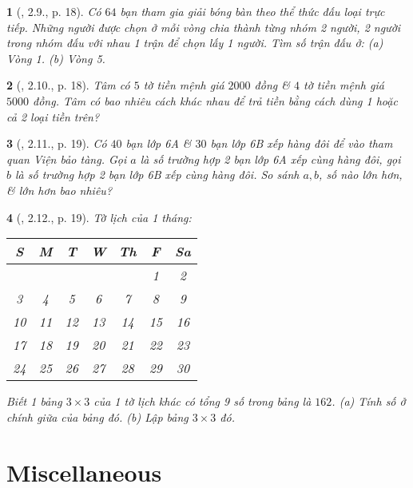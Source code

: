 \documentclass{article}
\newtheorem{baitoan}{}
\begin{document}
\begin{baitoan}[\cite{TLCT_THCS_Toan_6_so_hoc}, 2.9., p. 18]
	Có $64$ bạn tham gia giải bóng bàn theo thể thức đấu loại trực tiếp. Những người được chọn ở mỗi vòng chia thành từng nhóm 2 người, 2 người trong nhóm đấu với nhau 1 trận để chọn lấy 1 người. Tìm số trận đấu ở: (a) Vòng 1. (b) Vòng 5.
\end{baitoan}

\begin{baitoan}[\cite{TLCT_THCS_Toan_6_so_hoc}, 2.10., p. 18]
	Tâm có $5$ tờ tiền mệnh giá $2000$ đồng \& $4$ tờ tiền mệnh giá $5000$ đồng. Tâm có bao nhiêu cách khác nhau để trả tiền bằng cách dùng 1 hoặc cả 2 loại tiền trên?
\end{baitoan}

\begin{baitoan}[\cite{TLCT_THCS_Toan_6_so_hoc}, 2.11., p. 19]
	Có $40$ bạn lớp 6A \& $30$ bạn lớp 6B xếp hàng đôi để vào tham quan Viện bảo tàng. Gọi $a$ là số trường hợp 2 bạn lớp 6A xếp cùng hàng đôi, gọi $b$ là số trường hợp 2 bạn lớp 6B xếp cùng hàng đôi. So sánh $a,b$, số nào lớn hơn, \& lớn hơn bao nhiêu?
\end{baitoan}

\begin{baitoan}[\cite{TLCT_THCS_Toan_6_so_hoc}, 2.12., p. 19]
	Tờ lịch của 1 tháng:
	\begin{table}[H]
		\centering
		\begin{tabular}{|c|c|c|c|c|c|c|}
			\hline
			S & M & T & W & Th & F & Sa \\
			\hline
			&  &  &  &  & 1 & 2 \\
			3 & 4 & 5 & 6 & 7 & 8 & 9 \\
			10 & 11 & 12 & 13 & 14 & 15 & 16 \\
			17 & 18 & 19 & 20 & 21 & 22 & 23 \\
			24 & 25 & 26 & 27 & 28 & 29 & 30 \\
			\hline
		\end{tabular}
	\end{table}
	\noindent Biết 1 bảng $3\times3$ của 1 tờ lịch khác có tổng 9 số trong bảng là $162$. (a) Tính số ở chính giữa của bảng đó. (b) Lập bảng $3\times3$ đó.
\end{baitoan}


\section{Miscellaneous}
\end{document}
